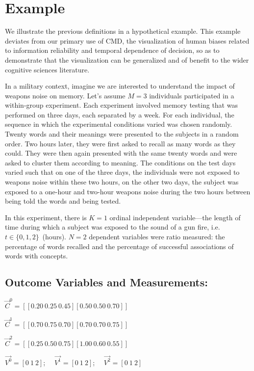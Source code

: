 \documentclass[conference]{IEEEtran}
\begin{document}
\section{Example}

We illustrate the previous definitions in a hypothetical example. This example deviates from our
primary use of CMD, the visualization of human biases related to information reliability and
temporal dependence of decision, so as to demonstrate that the visualization can be generalized and
of benefit to the wider cognitive sciences literature.

In a military context, imagine we are interested to understand the impact of weapons noise on
memory. Let's assume $M=3$ individuals participated in a within-group experiment. Each experiment
involved memory testing that was performed on three days, each separated by a week. For each
individual, the sequence in which the experimental conditions varied was chosen randomly. Twenty
words and their meanings were presented to the subjects in a random order. Two hours later, they
were first asked to recall as many words as they could. They were then again presented with the
same twenty words and were asked to cluster them according to meaning. The conditions on the test
days varied such that on one of the three days, the individuals were not exposed to weapons noise
within these two hours, on the other two days, the subject was exposed to a one-hour and two-hour
weapons noise during the two hours between being told the words and being tested.

In this experiment, there is $K=1$ ordinal independent variable---the length of time during which a
subject was exposed to the sound of a gun fire, i.e. $t\in\{0,1,2\}$~(hours). $N=2$ dependent
variables were ratio measured: the percentage of words recalled and the percentage of successful
associations of words with concepts.

\subsection{Outcome Variables and Measurements:}

$\vec{C}^0 = [[0.20 \ 0.25 \ 0.45] [0.50 \ 0.50 \ 0.70]]$

$\vec{C}^1 = [[0.70 \ 0.75 \ 0.70] [0.70 \ 0.70 \ 0.75]]$

$\vec{C}^2 = [[0.25 \ 0.50 \ 0.75] [1.00 \ 0.60 \ 0.55]]$

$\vec{V^0} = [0 \ 1 \ 2]$; \ \ $\vec{V^1} = [0 \ 1 \ 2]$; \ \ $\vec{V^2} = [0 \ 1 \ 2]$
\end{document}
